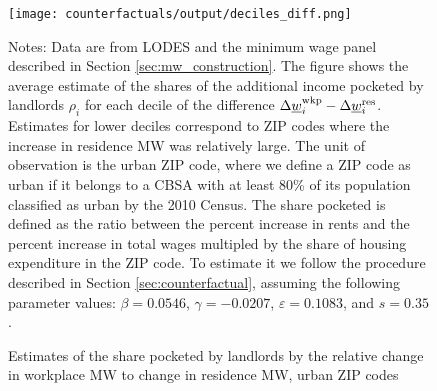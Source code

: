 \begin{figure}[h!]
    \centering
    \caption{Estimates of the share pocketed by landlords by the relative 
             change in workplace MW to change in residence MW, urban ZIP codes}
    \label{fig:rho_by_decile_MW_gap}

	\texttt{[image: counterfactuals/output/deciles\_diff.png]}

    \begin{minipage}{.95\textwidth} \footnotesize
        \vspace{3mm}
        Notes:
        Data are from LODES and the minimum wage panel described in Section 
        \ref{sec:mw_construction}.
        The figure shows the average estimate of the shares of the additional 
        income pocketed by landlords $\rho_i$ for each decile of the 
        difference $\Delta \underline{w}_i^{\text{wkp}} - \Delta \underline{w}_i^{\text{res}}$.
        Estimates for lower deciles correspond to ZIP codes where the increase 
        in residence MW was relatively large.
        The unit of observation is the urban ZIP code, where we define a ZIP code 
        as urban if it belongs to a CBSA with at least 80\% of its population 
        classified as urban by the 2010 Census.
        The share pocketed is defined as the ratio between the percent increase 
        in rents and the percent increase in total wages multipled by the share 
        of housing expenditure in the ZIP code.
        To estimate it we follow the procedure described in Section 
        \ref{sec:counterfactual}, assuming the following parameter values: 
        $\beta = 0.0546$, $\gamma = -0.0207$, $\varepsilon = 0.1083$, and 
        $s = 0.35$.
    \end{minipage}
\end{figure}
